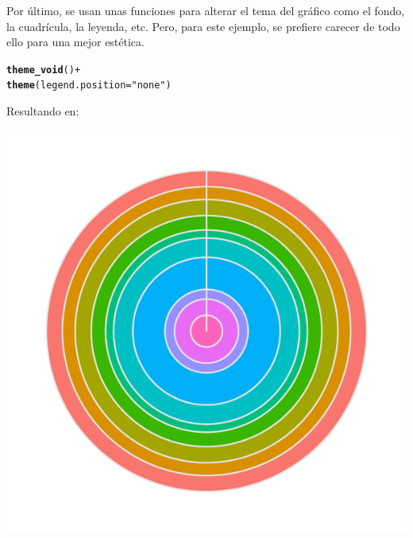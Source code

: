 \documentclass{article}\usepackage[]{graphicx}\usepackage[]{color}
\makeatletter
\def\maxwidth{ %
  \ifdim\Gin@nat@width>\linewidth
    \linewidth
  \else
    \Gin@nat@width
  \fi
}
\newcommand{\hlstr}[1]{\textcolor[rgb]{0.192,0.494,0.8}{#1}}%
\newcommand{\hlopt}[1]{\textcolor[rgb]{0,0,0}{#1}}%
\newcommand{\hlstd}[1]{\textcolor[rgb]{0.345,0.345,0.345}{#1}}%
\newcommand{\hlkwc}[1]{\textcolor[rgb]{0.333,0.667,0.333}{#1}}%
\newcommand{\hlkwd}[1]{\textcolor[rgb]{0.737,0.353,0.396}{\textbf{#1}}}%
\newenvironment{kframe}{%
 \def\at@end@of@kframe{}%
 \ifinner\ifhmode%
  \def\at@end@of@kframe{\end{minipage}}%
  \begin{minipage}{\columnwidth}%
 \fi\fi%
 \def\FrameCommand##1{\hskip\@totalleftmargin \hskip-\fboxsep
 \colorbox{shadecolor}{##1}\hskip-\fboxsep
     \hskip-\linewidth \hskip-\@totalleftmargin \hskip\columnwidth}%
 \MakeFramed {\advance\hsize-\width
   \@totalleftmargin\z@ \linewidth\hsize
   \@setminipage}}%
 {\par\unskip\endMakeFramed%
 \at@end@of@kframe}
\newenvironment{knitrout}{}{} %
\makeatother
\begin{document}
Por \'ultimo, se usan unas funciones para alterar el tema del gr\'afico como el fondo, la cuadr\'icula, la leyenda, etc. Pero, para este ejemplo, se prefiere carecer de todo ello para una mejor est\'etica.
\begin{knitrout}
\color{fgcolor}\begin{kframe}
\begin{alltt}
  \hlkwd{theme_void}\hlstd{()} \hlopt{+}
  \hlkwd{theme}\hlstd{(}\hlkwc{legend.position}\hlstd{=}\hlstr{"none"}\hlstd{)}
\end{alltt}
\end{kframe}
\end{knitrout}
Resultando en:
\begin{knitrout}
\color{fgcolor}

{\centering \includegraphics[width=\maxwidth]{figure/plot_ring_gg1-1} 

}



\end{knitrout}
\end{document}
